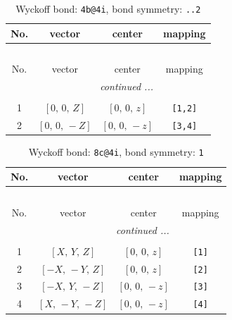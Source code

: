 \documentclass[fleqn,8pt]{jsarticle}
\begin{document}
\renewcommand{\arraystretch}{1.2}
\begin{longtable}{cccc}
\caption{Wyckoff bond: {\tt 4b@4i}, bond symmetry: {\tt ..2}}
 \\
 \hline \hline
No. & vector & center & mapping \\ \hline \endfirsthead

\multicolumn{3}{l}{\tablename\ \thetable{}} \\
 \hline \hline
No. & vector & center & mapping \\ \hline \endhead

 \hline \hline
\multicolumn{3}{r}{\footnotesize\it continued ...} \\ \endfoot

 \hline \hline
\multicolumn{3}{r}{} \\ \endlastfoot

1 & $\left[ 0,\, 0,\, Z \right]$ & $\left[ 0,\, 0,\, z \right]$ & {\tt [1,2]} \\ \hline
2 & $\left[ 0,\, 0,\, - Z \right]$ & $\left[ 0,\, 0,\, - z \right]$ & {\tt [3,4]} \\
\end{longtable}
\renewcommand{\arraystretch}{1.2}
\begin{longtable}{cccc}
\caption{Wyckoff bond: {\tt 8c@4i}, bond symmetry: {\tt 1}}
 \\
 \hline \hline
No. & vector & center & mapping \\ \hline \endfirsthead

\multicolumn{3}{l}{\tablename\ \thetable{}} \\
 \hline \hline
No. & vector & center & mapping \\ \hline \endhead

 \hline \hline
\multicolumn{3}{r}{\footnotesize\it continued ...} \\ \endfoot

 \hline \hline
\multicolumn{3}{r}{} \\ \endlastfoot

1 & $\left[ X,\, Y,\, Z \right]$ & $\left[ 0,\, 0,\, z \right]$ & {\tt [1]} \\ \hline
2 & $\left[ - X,\, - Y,\, Z \right]$ & $\left[ 0,\, 0,\, z \right]$ & {\tt [2]} \\ \hline
3 & $\left[ - X,\, Y,\, - Z \right]$ & $\left[ 0,\, 0,\, - z \right]$ & {\tt [3]} \\ \hline
4 & $\left[ X,\, - Y,\, - Z \right]$ & $\left[ 0,\, 0,\, - z \right]$ & {\tt [4]} \\
\end{longtable}
\end{document}
